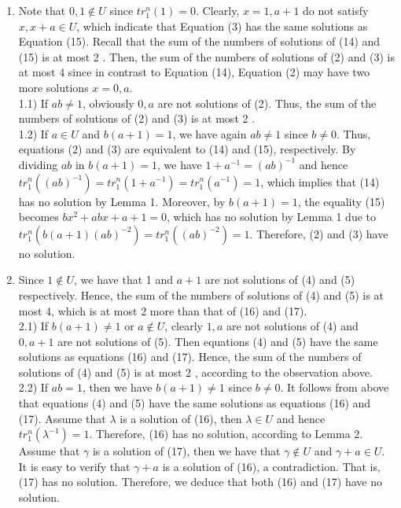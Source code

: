 \documentclass[10pt]{article}
\begin{document}
\begin{enumerate}
  \item Note that $0,1 \notin U$ since $t r_{1}^{n}(1)=0$. Clearly, $x=1, a+1$ do not satisfy $x, x+a \in U$, which indicate that Equation (3) has the same solutions as Equation (15). Recall that the sum of the numbers of solutions of (14) and (15) is at most 2 . Then, the sum of the numbers of solutions of (2) and (3) is at most 4 since in contrast to Equation (14), Equation (2) may have two more solutions $x=0, a$.\\
1.1) If $a b \neq 1$, obviously $0, a$ are not solutions of (2). Thus, the sum of the numbers of solutions of (2) and (3) is at most 2 .\\
1.2) If $a \in U$ and $b(a+1)=1$, we have again $a b \neq 1$ since $b \neq 0$. Thus, equations (2) and (3) are equivalent to (14) and (15), respectively. By dividing $a b$ in $b(a+1)=1$, we have $1+a^{-1}=(a b)^{-1}$ and hence $t r_{1}^{n}\left((a b)^{-1}\right)=t r_{1}^{n}\left(1+a^{-1}\right)=t r_{1}^{n}\left(a^{-1}\right)=1$, which implies that (14) has no solution by Lemma 1. Moreover, by $b(a+1)=1$, the equality (15) becomes $b x^{2}+a b x+a+1=0$, which has no solution by Lemma 1 due to $t r_{1}^{n}\left(b(a+1)(a b)^{-2}\right)=t r_{1}^{n}\left((a b)^{-2}\right)=1$. Therefore, (2) and (3) have no solution.
  \item Since $1 \notin U$, we have that 1 and $a+1$ are not solutions of (4) and (5) respectively. Hence, the sum of the numbers of solutions of (4) and (5) is at most 4, which is at most 2 more than that of (16) and (17).\\
2.1) If $b(a+1) \neq 1$ or $a \notin U$, clearly $1, a$ are not solutions of (4) and $0, a+1$ are not solutions of (5). Then equations (4) and (5) have the same solutions as equations (16) and (17). Hence, the sum of the numbers of solutions of (4) and (5) is at most 2 , according to the observation above.\\
2.2) If $a b=1$, then we have $b(a+1) \neq 1$ since $b \neq 0$. It follows from above that equations (4) and (5) have the same solutions as equations (16) and (17). Assume that $\lambda$ is a solution of (16), then $\lambda \in U$ and hence $t r_{1}^{n}\left(\lambda^{-1}\right)=1$. Therefore, (16) has no solution, according to Lemma 2. Assume that $\gamma$ is a solution of (17), then we have that $\gamma \notin U$ and $\gamma+a \in U$. It is easy to verify that $\gamma+a$ is a solution of (16), a contradiction. That is, (17) has no solution. Therefore, we deduce that both (16) and (17) have no solution.
\end{enumerate}
\end{document}
